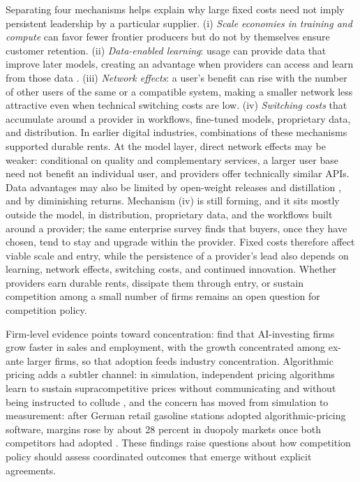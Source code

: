 \documentclass[12pt]{article}
\theoremstyle{plain}
\theoremstyle{definition}
\theoremstyle{remark}
\begin{document}
Separating four mechanisms helps explain why large fixed costs need
not imply persistent leadership by a particular supplier.
(i) \emph{Scale economies in training and compute} can favor fewer
frontier producers but do not by themselves ensure customer retention.
(ii) \emph{Data-enabled learning}: usage can provide data that improve
later models, creating an advantage when providers can access and learn
from those data
\citep{HagiuWright2023DataLearning}. (iii) \emph{Network effects}: a user's benefit can rise with the
number of other users of the same or a compatible system, making a
smaller network less attractive even when technical switching costs
are low. (iv) \emph{Switching costs} that accumulate
around a provider in workflows, fine-tuned models, proprietary data, and
distribution. In earlier digital industries, combinations of these mechanisms
supported durable rents. At the model layer, direct network effects
may be weaker: conditional on quality and complementary services, a
larger user base need not benefit an individual user, and providers
offer technically similar APIs. Data advantages may also be limited by
open-weight releases and distillation \citep[e.g.,][]{DeepSeekR1_2025},
and by diminishing returns. Mechanism (iv) is still forming, and it
sits mostly outside the model, in distribution, proprietary data, and
the workflows built around a provider; the same enterprise survey finds
that buyers, once they have chosen, tend to stay and upgrade within the
provider. Fixed costs therefore affect viable scale and entry, while the
persistence of a provider's lead also depends on learning, network
effects, switching costs, and continued innovation. Whether providers
earn durable rents, dissipate them through entry, or sustain
competition among a small number of firms remains an open question for
competition policy.

Firm-level evidence points toward concentration:
\citet{BabinaFedykHeHodson2024} find that AI-investing firms grow
faster in sales and employment, with the growth concentrated among
ex-ante larger firms, so that adoption feeds industry concentration.
Algorithmic pricing adds a subtler channel: in simulation,
independent pricing algorithms learn to sustain supracompetitive prices
without communicating and without being instructed to collude
\citep{CalvanoCalzolari2020}, and the concern has moved from simulation
to measurement: after German retail gasoline stations adopted
algorithmic-pricing software, margins rose by about 28 percent in
duopoly markets once both competitors had adopted \citep{AssadEtAl2024}.
These findings raise questions about how competition policy should
assess coordinated outcomes that emerge without explicit agreements.
\end{document}
